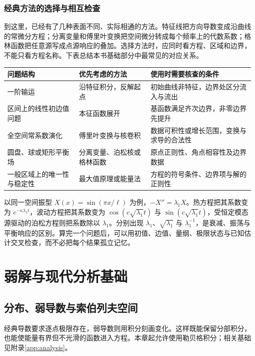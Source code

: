 \documentclass[UTF8,12pt,a4paper,fontset=fandol]{ctexbook}
\begin{document}
\section{经典方法的选择与相互检查}
\label{sec:method-comparison}
到这里，已经有了几种表面不同、实际相通的方法。特征线把方向导数变成沿曲线的常微分方程；分离变量和傅里叶变换把空间微分转成每个频率上的代数系数；格林函数把任意源写成点源响应的叠加。选择方法时，应同时看方程、区域和边界，不能只看方程名称。下表总结本书基础部分中最常见的对应关系。
\begin{center}
\begin{tabularx}{\textwidth}{@{}lYY@{}}
\toprule
问题结构 & 优先考虑的方法 & 使用时需要核查的条件\\
\midrule
一阶输运 & 沿特征积分，反解起点 & 初始曲线非特征，边界处区分流入与流出\\
区间上的线性初边值问题 & 本征函数展开 & 基函数满足齐次边界，非零边界先提升\\
全空间常系数演化 & 傅里叶变换与核卷积 & 数据可积性或增长范围，变换与求导的合法性\\
圆盘、球或矩形平衡场 & 分离变量、泊松核或格林函数 & 原点正则性、角点相容性及边界数据\\
一般区域上的唯一性与稳定性 & 最大值原理或能量法 & 方程的符号条件、边界项与解的正则性\\
\bottomrule
\end{tabularx}
\end{center}

以同一空间振型 $X(x)=\sin(\pi x/\ell)$ 为例，$-X''=\lambda_1X$。热方程把其系数变为 $e^{-\kappa\lambda_1t}$，波动方程把其系数变为 $\cos(c\sqrt{\lambda_1}t)$ 与 $\sin(c\sqrt{\lambda_1}t)$，受恒定模态源驱动的泊松方程则把系数除以 $\lambda_1$。分别出现 $\lambda_1$、$\sqrt{\lambda_1}$ 与 $\lambda_1^{-1}$，是衰减、振荡与平衡响应的区别。算完一个问题后，可以用初值、边值、量纲、极限状态与已知估计交叉检查，而不必把每个结果孤立记忆。

\part{弱解与现代分析基础}

\chapter{分布、弱导数与索伯列夫空间}
\label{chap:sobolev}

经典导数要求逐点极限存在，弱导数则用积分刻画变化。这样既能保留分部积分，也能使能量有界但不光滑的函数进入方程。本章起允许使用勒贝格积分；相关基础见附录\ref{app:analysis}。
\end{document}
